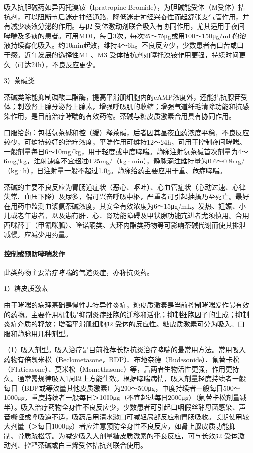 吸入抗胆碱药如异丙托溴铵（Ipratropine
Bromide），为胆碱能受体（M受体）拮抗剂，可以阻断节后迷走神经通路，降低迷走神经兴奋性而起舒张支气管作用，并有减少痰液分泌的作用。与β{2}
受体激动剂联合吸入有协同作用，尤其适用于夜间哮喘及多痰的患者。可用MDI，每日3次，每次25～75μg或用100～150μg/mL的溶液持续雾化吸入。约10min起效，维持4～6h。不良反应少，少数患者有口苦或口干感。近年发展的选择性M{1}
、M{3}
受体拮抗剂如噻托溴铵作用更强，持续时间更久（可达24h），不良反应更少。

3）茶碱类

茶碱类除能抑制磷酸二酯酶，提高平滑肌细胞内的cAMP浓度外，还能拮抗腺苷受体；刺激肾上腺分泌肾上腺素，增强呼吸肌的收缩；增强气道纤毛清除功能和抗感染作用，是目前治疗哮喘的有效药物。茶碱与糖皮质激素合用具有协同作用。

口服给药：包括氨茶碱和控（缓）释茶碱，后者因其昼夜血药浓度平稳，不良反应较少，可维持较好的治疗浓度，平喘作用可维持12～24h，可用于控制夜间哮喘。一般剂量每日6～10mg/kg，用于轻度或中度哮喘。静脉注射氨茶碱首次剂量为4～6mg/kg，注射速度不宜超过0.25mg/（kg·min），静脉滴注维持量为0.6～0.8mg/（kg·h），日注射量一般不超过1.0g。静脉给药主要应用于重、危症哮喘。

茶碱的主要不良反应为胃肠道症状（恶心、呕吐）、心血管症状（心动过速、心律失常、血压下降）及尿多，偶可兴奋呼吸中枢，严重者可引起抽搐乃至死亡。最好在用药中监测血浆氨茶碱浓度，其安全有效浓度为6～15μg/mL。发热、妊娠、小儿或老年患者，以及患有肝、心、肾功能障碍及甲状腺功能亢进者尤须慎用。合用西咪替丁（甲氰咪胍）、喹诺酮类、大环内酯类药物等可影响茶碱代谢而使其排泄减慢，应减少用药量。
\paragraph{控制或预防哮喘发作}

此类药物主要治疗哮喘的气道炎症，亦称抗炎药。

1）糖皮质激素

由于哮喘的病理基础是慢性非特异性炎症，糖皮质激素是当前控制哮喘发作最有效的药物。主要作用机制是抑制炎症细胞的迁移和活化；抑制细胞因子的生成；抑制炎症介质的释放；增强平滑肌细胞β{2}
受体的反应性。糖皮质激素可分为吸入、口服和静脉用几种剂型。

（1）吸入剂型。吸入治疗是目前推荐长期抗炎治疗哮喘的最常用方法。常用吸入药物有倍氯米松（Beclometasone，BDP）、布地奈德（Budesonide）、氟替卡松（Fluticasone）、莫米松（Momethasone）等，后两者生物活性更强，作用更持久。通常需规律吸入1周以上方能生效。根据哮喘病情，吸入剂量轻度持续者一般每日（BDP或等效量其他皮质激素）为200～500μg，中度持续者一般每日500～1000μg，重度持续者一般每日＞1000μg（不宜超过每日2000μg）（氟替卡松剂量减半）。吸入治疗药物全身性不良反应少，少数患者可引起口咽假丝酵母菌感染、声音嘶哑或呼吸道不适，吸药后用清水漱口可减轻局部反应和胃肠吸收。长期使用较大剂量（＞每日1000μg）者应注意预防全身性不良反应，如肾上腺皮质功能抑制、骨质疏松等。为减少吸入大剂量糖皮质激素的不良反应，可与长效β{2}
受体激动剂、控释茶碱或白三烯受体拮抗剂联合使用。


